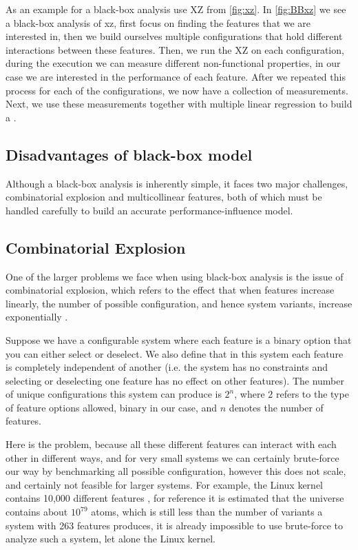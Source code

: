 As an example for a black-box analysis use XZ from \autoref{fig:xz}. In \autoref{fig:BBxz} we see a black-box analysis of xz, first focus on finding 
the features that we are interested in, then we build ourselves multiple configurations that hold different interactions between these features.
Then, we run the XZ on each configuration, during the execution we can measure different non-functional properties, in our case we are interested
in the performance of each feature. After we repeated this process for each of the configurations, we now have a collection of measurements.
Next, we use these measurements together with multiple linear regression to build a \perfInfluenceModel.

\subsection{Disadvantages of black-box model}
Although a black-box analysis is inherently simple, it faces two major challenges, combinatorial explosion and multicollinear features, both of which
must be handled carefully to build an accurate performance-influence model.

\subsection{Combinatorial Explosion}\label{section:combinatorial-explosion}
One of the larger problems we face when using black-box analysis is the issue of combinatorial explosion, 
which refers to the effect that when features increase linearly, the number of possible configuration, and hence system variants,
increase exponentially \cite{Combinatorial-explosion}.

Suppose we have a configurable system where each feature is a binary option that you can either select or deselect. We also define 
that in this system each feature is completely independent of another (i.e. the system has no constraints and selecting or deselecting one feature
has no effect on other features). The number of unique configurations this system can produce is $2^n$, where $2$ refers to
the type of feature options allowed, binary in our case, and $n$ denotes the number of features. 

Here is the problem, because all these different features can interact with each other in different ways, and for very small systems
we can certainly brute-force our way by benchmarking all possible configuration, however this does not scale, and certainly not feasible for 
larger systems. For example, the Linux kernel contains 10,000 different features \cite{Linux-Kernel}, for reference it is estimated that the universe
contains about $10^{79}$ atoms, which is still less than the number of variants a system with 263 features produces, it is already impossible to use brute-force to analyze
such a system, let alone the Linux kernel.

